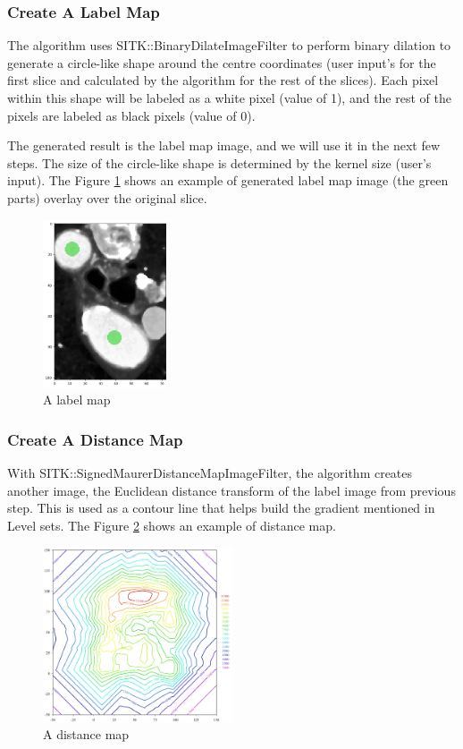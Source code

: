 \subsubsection{Create A Label Map}
The algorithm uses SITK::BinaryDilateImageFilter to perform binary dilation to generate a circle-like shape around the centre coordinates (user input’s for the first slice and calculated by the algorithm for the rest of the slices). Each pixel within this shape will be labeled as a white pixel (value of 1), and the rest of the pixels are labeled as black pixels (value of 0). 

The generated result is the label map image, and we will use it in the next few steps. The size of the circle-like shape is determined by the kernel size (user's input). The Figure \ref{fig_label_map} shows an example of generated label map image (the green parts) overlay over the original slice.

\begin{figure}[H]
    \centering
    \includegraphics[width=0.33\textwidth]{figures/AGR/label_image.png}
    \caption[A label image]{A label map}
    \label{fig_label_map}
\end{figure}

\subsubsection{Create A Distance Map}\label{distance_map}
With SITK::SignedMaurerDistanceMapImageFilter, the algorithm creates another image, the Euclidean distance transform of the label image from previous step. This is used as a contour line that helps build the gradient mentioned in Level sets. The Figure \ref{fig_distance_map} shows an example of distance map.

\begin{figure}[H]
    \centering
    \includegraphics[width=0.5\textwidth]{figures/AGR/Contour2D.png}
    \caption[A distance map]{A distance map}
    \label{fig_distance_map}
\end{figure}

